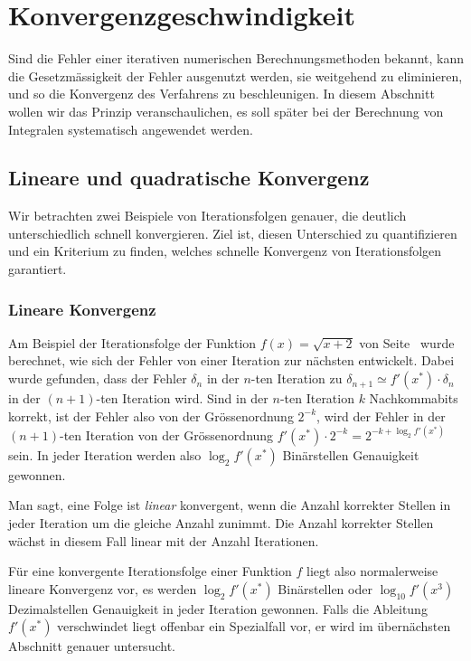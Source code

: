 %
%
%
\section{Konvergenzgeschwindigkeit
\label{buch:section:geschwidnigkeit}}
Sind die Fehler einer iterativen numerischen Berechnungsmethoden
bekannt, kann die Gesetzmässigkeit der Fehler ausgenutzt werden,
sie weitgehend zu eliminieren, und so die Konvergenz des Verfahrens
zu beschleunigen.
In diesem Abschnitt wollen wir das Prinzip veranschaulichen, es
soll später bei der Berechnung von Integralen systematisch
angewendet werden.

%
%
\subsection{Lineare und quadratische Konvergenz
\label{buch:subsection:linearekonvergenz}}
Wir betrachten zwei Beispiele von Iterationsfolgen genauer, die
deutlich unterschiedlich schnell konvergieren.
Ziel ist, diesen Unterschied zu quantifizieren und ein Kriterium
zu finden, welches schnelle Konvergenz von Iterationsfolgen garantiert.

\subsubsection{Lineare Konvergenz}
Am Beispiel der Iterationsfolge der Funktion $f(x)=\sqrt{x+2}$
von Seite~\pageref{section:beispiel:sqrtiteration}
wurde berechnet, wie sich der Fehler von einer Iteration zur nächsten
entwickelt.
Dabei wurde gefunden, dass der Fehler $\delta_n$ in der $n$-ten Iteration
zu $\delta_{n+1}\simeq f'(x^*)\cdot\delta_n$ in der $(n+1)$-ten Iteration
wird.
Sind in der $n$-ten Iteration $k$ Nachkommabits korrekt, ist der Fehler
also von der Grössenordnung $2^{-k}$, wird der Fehler in der $(n+1)$-ten
Iteration von der Grössenordnung $f'(x^*) \cdot 2^{-k}= 2^{-k+\log_2f'(x^*)}$
sein.
In jeder Iteration werden also $\log_2f'(x^*)$ Binärstellen Genauigkeit
gewonnen.

Man sagt, eine Folge ist {\em linear} konvergent, wenn die Anzahl
korrekter Stellen in jeder Iteration um die gleiche Anzahl zunimmt.
Die Anzahl korrekter Stellen wächst in diesem Fall linear mit der
Anzahl Iterationen.

Für eine konvergente Iterationsfolge einer Funktion $f$ liegt also
normalerweise lineare Konvergenz vor, es werden $\log_2 f'(x^*)$
Binärstellen oder $\log_10 f'(x^3)$ Dezimalstellen Genauigkeit in
jeder Iteration gewonnen.
Falls die Ableitung $f'(x^*)$ verschwindet liegt offenbar ein
Spezialfall vor, er wird im übernächsten Abschnitt genauer untersucht.

